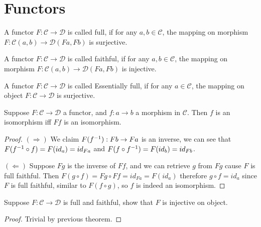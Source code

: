 \documentclass[./main.tex]{subfiles}
\begin{document}
\section{Functors}

\begin{definition}[Full]
  A functor $F : \mathcal{C} \rightarrow \mathcal{D}$ is called full, if for any $a, b \in \mathcal{C}$, the
  mapping on morphism $F : \mathcal{C}(a, b) \rightarrow \mathcal{D}(Fa, Fb)$ is surjective.
\end{definition}

\begin{definition}[Faithful]
  A functor $F : \mathcal{C} \rightarrow \mathcal{D}$ is called faithful, if for any $a, b \in \mathcal{C}$, the
  mapping on morphism $F : \mathcal{C}(a, b) \rightarrow \mathcal{D}(Fa, Fb)$ is injective.
\end{definition}

\begin{definition}
  A functor $F : \mathcal{C} \rightarrow \mathcal{D}$ is called Essentially full, if for any $a \in \mathcal{C}$, the
  mapping on object $F : \mathcal{C} \rightarrow \mathcal{D}$ is surjective.
\end{definition}

\begin{theorem}
  Suppose $F : \mathcal{C} \rightarrow \mathcal{D}$ a functor,
  and $f : a \rightarrow b$ a morphism in $\mathcal{C}$.
  Then $f$ is an isomorphism iff $Ff$ is an isomorphism.
\end{theorem}
\begin{proof}
  $(\Rightarrow)$ We claim $F(f^{-1}) : Fb \rightarrow Fa$ is an inverse,
  we can see that $F(f^{-1} \circ f) = F(id_a) = id_{Fa}$ and $F(f \circ f^{-1}) = F(id_b) = id_{Fb}$.

  $(\Leftarrow)$ Suppose $Fg$ is the inverse of $Ff$, and we can retrieve $g$ from $Fg$
  cause $F$ is full faithful. Then $F(g \circ f) = Fg \circ Ff = id_{Fa} = F(id_a)$
  therefore $g \circ f = id_a$ since $F$ is full faithful, similar to $F(f \circ g)$,
  so $f$ is indeed an isomorphism.
\end{proof}

\begin{corollary}
  Suppose $F : \mathcal{C} \rightarrow \mathcal{D}$ is full and faithful, 
  show that $F$ is injective on object.
\end{corollary}
\begin{proof}
  Trivial by previous theorem.
\end{proof}
\end{document}
